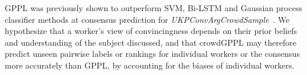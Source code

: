 GPPL was previously shown to outperform SVM, Bi-LSTM and 
Gaussian process classifier methods at consensus prediction for \emph{UKPConvArgCrowdSample}~\citep{simpson2018finding}. 
We hypothesize that a worker's view of convincingness 
depends on their prior beliefs and understanding of the subject 
discussed, and that crowdGPPL may therefore
predict unseen 
pairwise labels or rankings for individual workers or the consensus more accurately than GPPL,
by accounting 
for the biases of individual workers.

